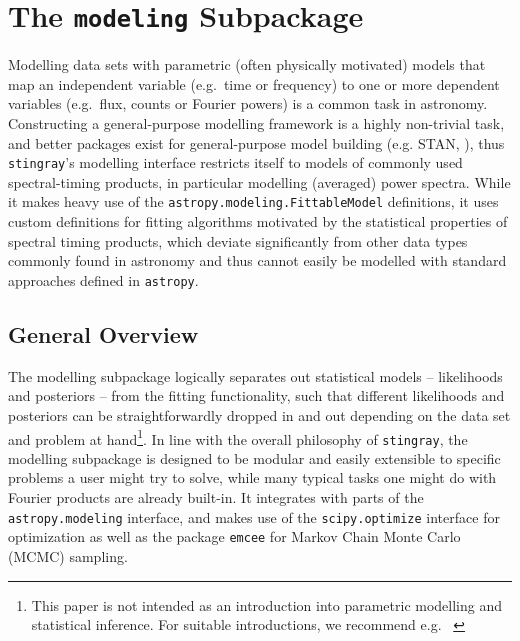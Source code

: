 \documentclass[twocolumn]{aastex62}
\newcommand{\stingray}{\texttt{stingray}\xspace}
\begin{document}


 


\section{The \texttt{modeling} Subpackage}
\label{sec:modeling}

Modelling data sets with parametric (often physically motivated) models that map an independent variable (e.g.\ time or frequency) to one or more dependent variables (e.g.\ flux, counts or Fourier powers) is a common task in astronomy. Constructing a general-purpose modelling framework is a highly non-trivial task, and better packages exist for general-purpose model building (e.g. STAN, \citealt{stan}), thus \stingray's modelling interface restricts itself to models of commonly used spectral-timing products, in particular modelling (averaged) power spectra. 
While it makes heavy use of the \verb|astropy.modeling.FittableModel| definitions, it uses custom definitions for fitting algorithms motivated by the statistical properties of spectral timing products, which deviate significantly from other data types commonly found in astronomy and thus cannot easily be modelled with standard approaches defined in \texttt{astropy}.

\subsection{General Overview}
The modelling subpackage logically separates out statistical models -- likelihoods and posteriors -- from the fitting functionality, such that different likelihoods and posteriors can be straightforwardly dropped in and out depending on the data set and problem at hand\footnote{This paper is not intended as an introduction into parametric modelling and statistical inference. For suitable introductions, we recommend e.g.~ \citet{hogg2010}}. In line with the overall philosophy of \stingray, the modelling subpackage is designed to be modular and easily extensible to specific problems a user might try to solve, while many typical tasks one might do with Fourier products are already built-in. It integrates with parts of the \verb|astropy.modeling| interface, and makes use of the \verb|scipy.optimize| interface for optimization as well as the package \texttt{emcee} for Markov Chain Monte Carlo (MCMC) sampling.
\end{document}
